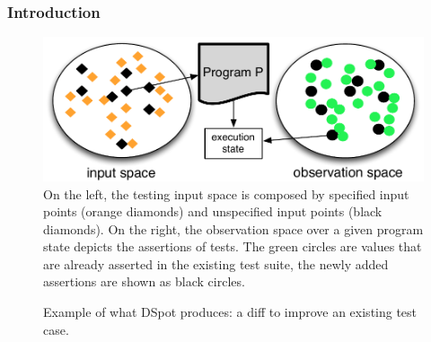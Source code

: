 \documentclass[11pt]{sdm}
\newcommand{\dspot}{DSpot\xspace}
\begin{document}
\subsubsection{Introduction}
\begin{figure}
  \centering
  \includegraphics[scale=0.5]{io-spaces.pdf}
  \caption{On the left, the testing input space is composed by specified input points (orange diamonds) and unspecified input points (black diamonds). On the right, the observation space over a given program state depicts the assertions of tests. The green circles are values that are already asserted in the existing test suite, the newly added assertions are shown as black circles.}
\label{fig:io-spaces}
\end{figure}

\begin{figure}
  \centering
  \caption{Example of what \dspot{} produces: a diff to improve an existing test case.}
\label{fig:diff-protostuff}
\end{figure}
\end{document}
